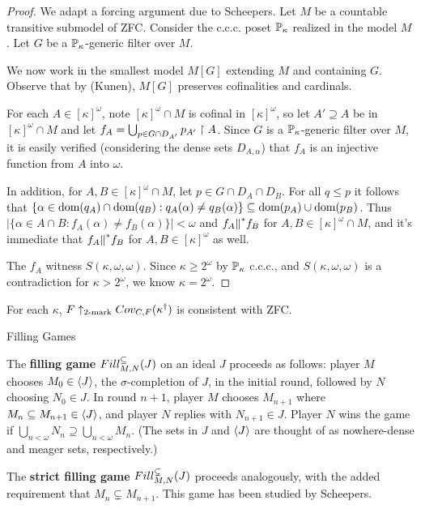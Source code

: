   \begin{proof}
    We adapt a forcing argument due to Scheepers. Let $M$ be a countable transitive submodel of ZFC. Consider the c.c.c. poset $\mathbb{P}_\kappa$ realized in the model $M$. Let $G$ be a $\mathbb{P}_\kappa$-generic filter over $M$.

    We now work in the smallest model $M[G]$ extending $M$ and containing $G$. Observe that by (Kunen), $M[G]$ preserves cofinalities and cardinals.

    For each $A\in [\kappa]^\omega$, note $[\kappa]^\omega\cap M$ is cofinal in $[\kappa]^\omega$, so let $A'\supseteq A$ be in $[\kappa]^\omega\cap M$ and let $f_A=\bigcup_{p\in G\cap D_{A'}}p_{A'}\restriction A$. Since $G$ is a $\mathbb{P}_\kappa$-generic filter over $M$, it is easily verified (considering the dense sets $D_{A,\alpha}$) that $f_A$ is an injective function from $A$ into $\omega$.

    In addition, for $A,B\in [\kappa]^\omega\cap M$, let $p\in G\cap D_A\cap D_B$. For all $q\leq p$ it follows that $\{\alpha\in \textrm{dom}(q_A)\cap \textrm{dom}(q_B): q_A(\alpha)\not= q_B(\alpha)\} \subseteq \textrm{dom}(p_A)\cup\textrm{dom}(p_B)$. Thus $|\{\alpha\in A\cap B: f_A(\alpha)\not= f_B(\alpha)\}|<\omega$ and $f_A{\parallel}^* f_B$ for $A,B\in [\kappa]^\omega\cap M$, and it's immediate that $f_A{\parallel}^* f_B$ for $A,B\in[\kappa]^\omega$ as well.

    The $f_A$ witness $S(\kappa,\omega,\omega)$. Since $\kappa\geq 2^\omega$ by $\mathbb{P}_\kappa$ c.c.c., and $S(\kappa,\omega,\omega)$ is a contradiction for $\kappa>2^\omega$, we know $\kappa=2^\omega$. 
  \end{proof}

  \begin{corollary}
    For each $\kappa$, $F\uparrow_{2\text{-mark}}Cov_{C,F}(\kappa^\dagger)$ is consistent with ZFC.
  \end{corollary}












\newpage

  \centerline{Filling Games}

  \begin{definition}
    The \textbf{filling game} $Fill^{\subseteq}_{M,N}(J)$ on an ideal $J$ proceeds as follows: player $M$ chooses $M_0 \in \langle J\rangle$, the $\sigma$-completion of $J$, in the initial round, followed by $N$ choosing $N_0\in J$. In round $n+1$, player $M$ chooses $M_{n+1}$ where $M_n\subseteq M_{n+1}\in\langle J\rangle$, and player $N$ replies with $N_{n+1}\in J$. Player $N$ wins the game if $\bigcup_{n<\omega} N_n \supseteq \bigcup_{n<\omega} M_n$. (The sets in $J$ and $\langle J\rangle$ are thought of as nowhere-dense and meager sets, respectively.)

    The \textbf{strict filling game} $Fill^{\subsetneq}_{M,N}(J)$ proceeds analogously, with the added requirement that $M_n\subsetneq M_{n+1}$. This game has been studied by Scheepers.
  \end{definition}

